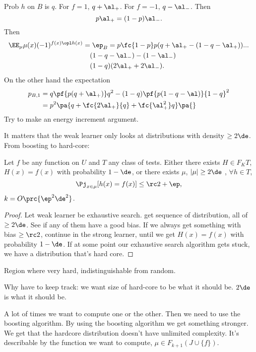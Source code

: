 Prob $h$ on $B$ is $q$. 
For $f=1$, $q+\al_+$. For $f=-1$, $q-\al_-$. Then 
$$
p\al_+ = (1-p)\al_-.
$$
Then 
\begin{align}
\EE_\mu \mu(x)(-1)^{f(x) \opl h(x)} &= \ep_B = p \fc{1-p}p (q+\al_+-(1-q-\al_+))...\\
&\quad (1-q-\al_-) - (1-\al_-)\\
&\quad (1-q) (2\al_++2\al_-).
\end{align}
On the other hand the expectation 
\begin{align}
p_{B, 1} &= q\pf{p(q+\al_+)}q^2 - (1-q) \pf{p(1-q - \al)}{1-q}^2\\
&= p^2\pa{q + \fc{2\al_+}{q} + \fc{\al_+^2}q}
\pa{}
\end{align}
Try to make an energy increment argument.

It matters that the weak learner only looks at distributions with density $\ge 2\de$. From boosting to hard-core: 
\begin{lem}
Let $f$ be any function on $U$ and $T$ any class of tests. Either there exists $H\in F_K T$, $H(x)=f(x)$ with probability $1-\de$, or there exists $\mu$, $|\mu|\ge 2\de$ , $\forall h\in T$, 
$$
\Pj_{x\in \mu} [h(x) = f(x)] \le \rc2 + \ep,
$$
$k=O\prc{\ep^2\de^2}$.
\end{lem}

\begin{proof}
Let weak learner be exhaustive search. get sequence of distribution, all of $\ge 2\de$. See if any of them have a good bias. If we always get something with bias $\ge \rc 2$, continue in the strong learner, until we get $H(x)=f(x)$ with probability $1-\de$. If at some point our exhaustive search algorithm gets stuck, we have a distribution that's hard core.
\end{proof}
Region where very hard, indistinguishable from random.

Why have to keep track: we want size of hard-core to be what it should be. $2\de$ is what it should be. 


A lot of times we want to compute one or the other. Then we need to use the boosting algorithm. By using the boosting algorithm we get something stronger. We get that the hardcore distribution doesn't have unlimited complexity. It's describable by the function we want to compute, $
\mu \in F_{k+1} (J\cup \{f\})$. 


